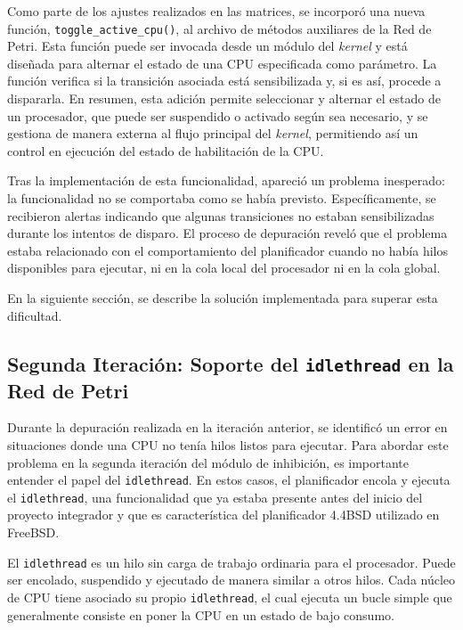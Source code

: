 Como parte de los ajustes realizados en las matrices, se incorporó una nueva función, \linebreak\verb|toggle_active_cpu()|, al archivo de métodos auxiliares de la Red de Petri. Esta función puede ser invocada desde un módulo del \textit{kernel} y está diseñada para alternar el estado de una CPU especificada como parámetro. La función verifica si la transición asociada está sensibilizada y, si es así, procede a dispararla. En resumen, esta adición permite seleccionar y alternar el estado de un procesador, que puede ser suspendido o activado según sea necesario, y se gestiona de manera externa al flujo principal del \textit{kernel}, permitiendo así un control en ejecución del estado de habilitación de la CPU.\par

Tras la implementación de esta funcionalidad, apareció un problema inesperado: la funcionalidad no se comportaba como se había previsto. Específicamente, se recibieron alertas indicando que algunas transiciones no estaban sensibilizadas durante los intentos de disparo. El proceso de depuración reveló que el problema estaba relacionado con el comportamiento del planificador cuando no había hilos disponibles para ejecutar, ni en la cola local del procesador ni en la cola global.\par

En la siguiente sección, se describe la solución implementada para superar esta dificultad.\par

\subsection{Segunda Iteración: Soporte del \texttt{idlethread} en la Red de Petri}
\label{ch:idlethread}

Durante la depuración realizada en la iteración anterior, se identificó un error en situaciones donde una CPU no tenía hilos listos para ejecutar. Para abordar este problema en la segunda iteración del módulo de inhibición, es importante entender el papel del \texttt{idlethread}. En estos casos, el planificador encola y ejecuta el \texttt{idlethread}, una funcionalidad que ya estaba presente antes del inicio del proyecto integrador y que es característica del planificador 4.4BSD utilizado en FreeBSD.\par

El \texttt{idlethread} es un hilo sin carga de trabajo ordinaria para el procesador. Puede ser encolado, suspendido y ejecutado de manera similar a otros hilos. Cada núcleo de CPU tiene asociado su propio \texttt{idlethread}, el cual ejecuta un bucle simple que generalmente consiste en poner la CPU en un estado de bajo consumo.\par

